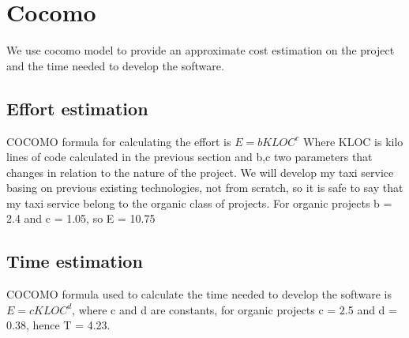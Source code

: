 \section{Cocomo}
We use cocomo model to provide an approximate cost estimation on the project and the time needed to develop the software.

\subsection{Effort estimation}
COCOMO formula for calculating the effort is $E= bKLOC^{c}$
Where KLOC is kilo lines of code calculated in the previous section and b,c two parameters that changes in relation to the nature of the project.
We will develop my taxi service basing on previous existing technologies, not from scratch, so it is safe to say that my taxi service belong to the organic class of projects.
For organic projects b = 2.4 and c = 1.05, so E = 10.75

\subsection{Time estimation}
COCOMO formula used to calculate the time needed to develop the software is $E = cKLOC^{d}$, where c and d are constants, for organic projects c = 2.5 and d = 0.38, hence T = 4.23.

